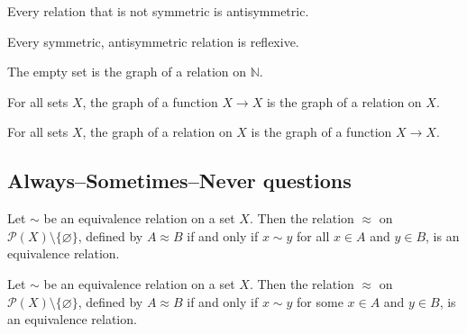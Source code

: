 \begin{chapex} %
Every relation that is not symmetric is antisymmetric.
\end{chapex}

\begin{chapex} %
Every symmetric, antisymmetric relation is reflexive.
\end{chapex}

\begin{chapex} %
The empty set is the graph of a relation on $\mathbb{N}$.
\end{chapex}

\begin{chapex} %
For all sets $X$, the graph of a function $X \to X$ is the graph of a relation on $X$.
\end{chapex}

\begin{chapex} %
For all sets $X$, the graph of a relation on $X$ is the graph of a function $X \to X$.
\end{chapex}

\begin{chapex}
\label{cqRelationsTFEnd}

\end{chapex}

\subsection*{Always--Sometimes--Never questions}


\begin{chapex}
\label{cqRelationsASNBegin}

\end{chapex}

\begin{chapex}

\end{chapex}

\begin{chapex} %
Let $\sim$ be an equivalence relation on a set $X$. Then the relation $\approx$ on $\mathcal{P}(X) \setminus \{ \varnothing \}$, defined by $A \approx B$ if and only if $x \sim y$ for all $x \in A$ and $y \in B$, is an equivalence relation.
\end{chapex}

\begin{chapex} %
Let $\sim$ be an equivalence relation on a set $X$. Then the relation $\approx$ on $\mathcal{P}(X) \setminus \{ \varnothing \}$, defined by $A \approx B$ if and only if $x \sim y$ for some $x \in A$ and $y \in B$, is an equivalence relation.
\end{chapex}

\begin{chapex}
\label{cqRelationsASNEnd}

\end{chapex}